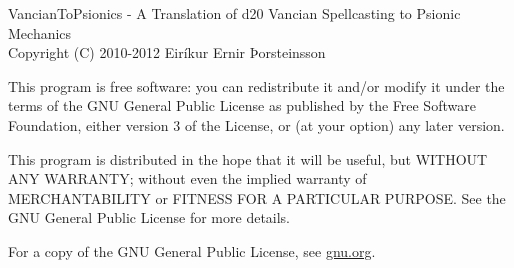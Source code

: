 VancianToPsionics - A Translation of d20 Vancian Spellcasting to Psionic Mechanics\\
Copyright (C) 2010-2012 Eiríkur Ernir Þorsteinsson

This program is free software: you can redistribute it and/or modify
it under the terms of the GNU General Public License as published by
the Free Software Foundation, either version 3 of the License, or
(at your option) any later version.

This program is distributed in the hope that it will be useful,
but WITHOUT ANY WARRANTY; without even the implied warranty of
MERCHANTABILITY or FITNESS FOR A PARTICULAR PURPOSE.  See the
GNU General Public License for more details.

For a copy of the GNU General Public License, see \href{http://www.gnu.org/licenses/}{gnu.org}.